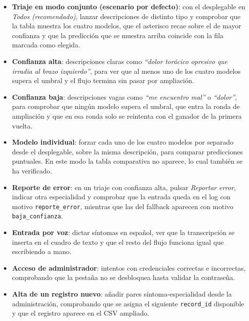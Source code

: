 \begin{itemize}
	\item \textbf{Triaje en modo conjunto (escenario por defecto)}: con el desplegable en \textit{Todos (recomendado)}, lanzar descripciones de distinto tipo y comprobar que la tabla muestra los cuatro modelos, que el asterisco recae sobre el de mayor confianza y que la predicción que se muestra arriba coincide con la fila marcada como elegida.
	
	\item \textbf{Confianza alta}: descripciones claras como \textit{``dolor torácico opresivo que irradia al brazo izquierdo''}, para ver que al menos uno de los cuatro modelos supera el umbral y el flujo termina sin pasar por ampliación.
	
	\item \textbf{Confianza baja}: descripciones vagas como \textit{``me encuentro mal''} o \textit{``dolor''}, para comprobar que ningún modelo supera el umbral, que entra la ronda de ampliación y que en esa ronda solo se reintenta con el ganador de la primera vuelta.
	
	\item \textbf{Modelo individual}: forzar cada uno de los cuatro modelos por separado desde el desplegable, sobre la misma descripción, para comparar predicciones puntuales. En este modo la tabla comparativa no aparece, lo cual también se ha verificado.
	
	\item \textbf{Reporte de error}: en un triaje con confianza alta, pulsar \textit{Reportar error}, indicar otra especialidad y comprobar que la entrada queda en el log con motivo \texttt{reporte\_error}, mientras que las del fallback aparecen con motivo \texttt{baja\_confianza}.
	
	\item \textbf{Entrada por voz}: dictar síntomas en español, ver que la transcripción se inserta en el cuadro de texto y que el resto del flujo funciona igual que escribiendo a mano.
	
	\item \textbf{Acceso de administrador}: intentos con credenciales correctas e incorrectas, comprobando que la pestaña no se desbloquea hasta validar la contraseña.
	
	\item \textbf{Alta de un registro nuevo}: añadir pares síntoma-especialidad desde la administración, comprobando que se asigna el siguiente \texttt{record\_id} disponible y que el registro aparece en el CSV ampliado.
	

\end{itemize}
